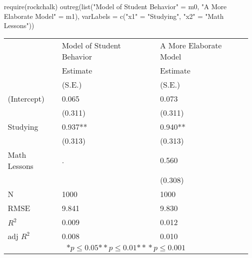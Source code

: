 \begin{Schunk}
\begin{Sinput}
 require(rockchalk)
 outreg(list("Model of Student Behavior" = m0, "A More Elaborate Model" = m1), varLabels = c("x1" = "Studying", "x2" = "Math Lessons"))
\end{Sinput}
\begin{tabular}{*{3}{l}}
\hline
                  & Model of Student Behavior & A More Elaborate Model   \tabularnewline
                   &Estimate   &Estimate \tabularnewline
                 &(S.E.)   &(S.E.) \tabularnewline
 \hline
 \hline
   (Intercept)     &0.065 &0.073 \tabularnewline
                 &(0.311)   &(0.311)  \tabularnewline
   Studying        &0.937** &0.940** \tabularnewline
                 &(0.313)   &(0.313)  \tabularnewline
   Math Lessons      & .      &0.560 \tabularnewline
                 &         &(0.308)  \tabularnewline
 \hline
 N                 &1000       &1000       \tabularnewline
 RMSE             &9.841   &9.830   \tabularnewline
 $R^2$             &0.009   &0.012   \tabularnewline
 adj $R^2$         &0.008   &0.010   \tabularnewline
 \hline
\hline
 
 \multicolumn{3}{c}{${*  p}\le 0.05$${*\!\!*  p}\le 0.01$${*\!\!*\!\!*  p}\le 0.001$}\tabularnewline
 \end{tabular}\end{Schunk}
